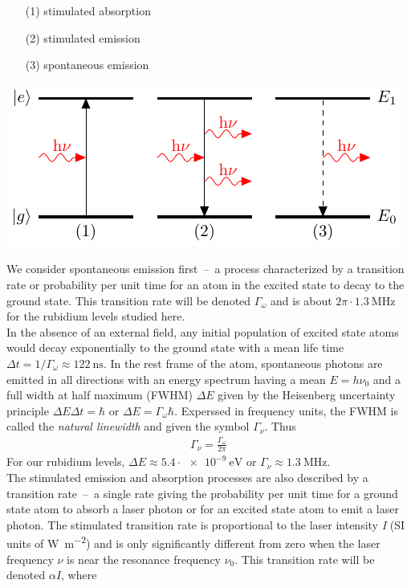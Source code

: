 \begin{minipage}[c][][c]{.35\textwidth}
\begin{itemize}
\item[(1)] stimulated absorption
\item[(2)] stimulated emission
\item[(3)] spontaneous emission
\end{itemize}
\end{minipage}
\hfill
\begin{minipage}[c]{.55\textwidth}
\includegraphics[width=\textwidth]{twolevel}
\end{minipage}
\bigskip

We consider spontaneous emission first~--~a process characterized by a transition rate or probability
per unit time for an atom in the excited state to decay to the ground state. This transition rate will 
be denoted \(\Gamma_\omega \) and is about \(2\pi\cdot \SI{1.3}{\mega\hertz} \) for the rubidium levels
studied here. \\
In the absence of an external field, any initial population of excited state atoms would decay exponentially
to the ground state with a mean life time \(\Delta t = 1/\Gamma_\omega \approx \SI{122}{\nano\second} \).
In the rest frame of the atom, spontaneous photons are emitted in all directions with an energy spectrum
having a mean \(E=h\nu_0 \) and a full width at half maximum (FWHM) \(\Delta E \) given by the
Heisenberg uncertainty principle \(\Delta E \Delta t = \hbar \) or \(\Delta E = \Gamma_\omega\hbar \).
Experssed in frequency units, the FWHM is called the \textit{natural linewidth} and given the symbol
\(\Gamma_\nu \). Thus
\begin{align}
    \Gamma_\nu = \frac{\Gamma_\omega}{2\pi}
\end{align}
For our rubidium levels, \(\Delta E \approx 5.4\cdot \SI{e-9}{\electronvolt} \) or \(\Gamma_\nu\approx \SI{1.3}{\mega\hertz} \). \\ 
The stimulated emission and absorption processes are also described by a transition rate~--~a single rate
giving the probability per unit time for a ground state atom to absorb a laser photon or for an excited
state atom to emit a laser photon. The stimulated transition rate is proportional to the laser intensity
\textit{I} (SI units of \si{\watt\per\meter\squared}) and is only significantly different from zero when
the laser frequency \(\nu \) is near the resonance frequency \(\nu_0 \). This transition rate will be denoted
\(\alpha I \), where 

